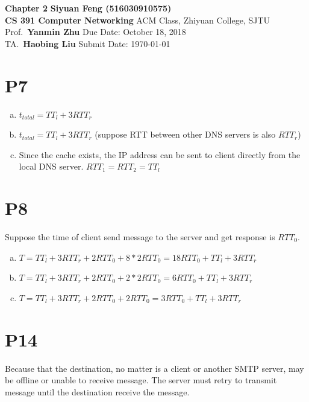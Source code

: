 \documentclass[a4paper, 11pt]{article}
\begin{document}
\noindent
\large\textbf{Chapter 2} \hfill \textbf{Siyuan Feng (516030910575)} \\
\normalsize {\bf CS 391 Computer Networking} \hfill ACM Class, Zhiyuan College, SJTU\\
Prof.~{\bf Yanmin Zhu} \hfill Due Date: October 18, 2018\\
TA.~{\bf Haobing Liu} \hfill Submit Date: \today

\section*{P7}
\begin{enumerate}[a.]
	\item $t_{total} = TT_l + 3RTT_r$
	\item $t_{total} = TT_l + 3RTT_r$ (suppose RTT between other DNS servers is also $RTT_r$)
	\item Since the cache exists, the IP address can be sent to client directly from the local DNS server. $RTT_1 = RTT_2 = TT_l$
\end{enumerate}

\section*{P8}
Suppose the time of client send message to the server and get response is $RTT_0$.
\begin{enumerate}[a.]
	\item $T = TT_l + 3RTT_r + 2RTT_0 + 8*2RTT_0 = 18RTT_0 + TT_l + 3RTT_r$
	\item $T = TT_l + 3RTT_r + 2RTT_0 + 2*2RTT_0 = 6RTT_0 + TT_l + 3RTT_r$
	\item $T = TT_l + 3RTT_r + 2RTT_0 + 2RTT_0 = 3RTT_0 + TT_l + 3RTT_r$
\end{enumerate}	
\section*{P14}
    Because that the destination, no matter is a client or another SMTP server, may be offline or unable to receive message. The server must retry to transmit message until the destination receive the message.
\end{document}
